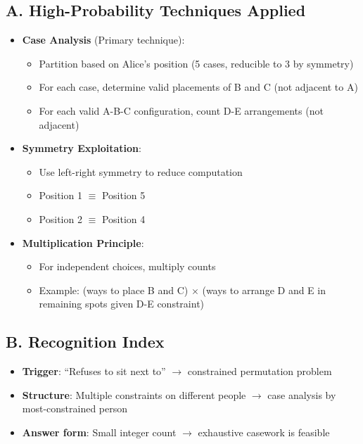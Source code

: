 \documentclass[]{article}
\begin{document}
\begin{techniquesbox}
\subsection*{A. High-Probability Techniques Applied}
\begin{itemize}[leftmargin=*]
    \item \textbf{Case Analysis} (Primary technique): 
    \begin{itemize}
        \item Partition based on Alice's position (5 cases, reducible to 3 by symmetry)
        \item For each case, determine valid placements of B and C (not adjacent to A)
        \item For each valid A-B-C configuration, count D-E arrangements (not adjacent)
    \end{itemize}
    
    \item \textbf{Symmetry Exploitation}: 
    \begin{itemize}
        \item Use left-right symmetry to reduce computation
        \item Position 1 $\equiv$ Position 5
        \item Position 2 $\equiv$ Position 4
    \end{itemize}
    
    \item \textbf{Multiplication Principle}: 
    \begin{itemize}
        \item For independent choices, multiply counts
        \item Example: (ways to place B and C) $\times$ (ways to arrange D and E in remaining spots given D-E constraint)
    \end{itemize}
\end{itemize}

\subsection*{B. Recognition Index}
\begin{itemize}[leftmargin=*]
    \item \textbf{Trigger}: ``Refuses to sit next to'' $\rightarrow$ constrained permutation problem
    \item \textbf{Structure}: Multiple constraints on different people $\rightarrow$ case analysis by most-constrained person
    \item \textbf{Answer form}: Small integer count $\rightarrow$ exhaustive casework is feasible
\end{itemize}


\end{techniquesbox}
\end{document}
